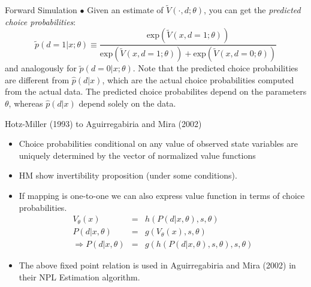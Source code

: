 \documentclass[xcolor=pdftex,dvipsnames,table,mathserif,aspectratio=169]{beamer}
\begin{document}
\begin{frame}{Forward Simulation}
$\bullet$ Given an estimate of $\tilde V (\cdot, d; \theta)$, you can get the \emph{predicted choice probabilities}: 
\begin{equation}
\tilde p (d =1 |x ; \theta) \equiv \frac {\text{exp} \left ( \tilde V (x, d=1; \theta) \right )}{\text{exp} \left ( \tilde V (x, d=1 ;\theta) \right ) + \text{exp} \left ( \tilde V (x, d= 0 ;\theta ) \right )}
\end{equation}
and analogously for $\tilde p (d = 0 |x ; \theta)$. Note that the predicted choice probabilities are different from $\hat p (d|x)$, which are the actual choice probabilities computed from the actual data. The predicted choice probabilites depend on the parameters $\theta$, whereas $\hat p (d|x)$ depend solely on the data. 
\end{frame}

\begin{frame}{Hotz-Miller (1993) to Aguirregabiria and Mira (2002)}
\begin{itemize}
\item Choice probabilities conditional on any value of observed state variables are uniquely determined by the vector of normalized value functions
\item HM show invertibility proposition (under some conditions).
\item If mapping is one-to-one we can also express value function in terms of choice probabilities. 
\begin{eqnarray*}
V_{\theta}(x) &=& h(P(d | x,\theta),s,\theta)\\
P(d | x,\theta) &=& g(V_{\theta}(x),s,\theta) \\
\Rightarrow P(d | x,\theta) &=& g(h(P(d | x, \theta),s ,\theta),s,\theta)
\end{eqnarray*}
\item The above fixed point relation is used in Aguirregabiria and Mira (2002) in their NPL Estimation algorithm.
\end{itemize}
\end{frame}
\end{document}
